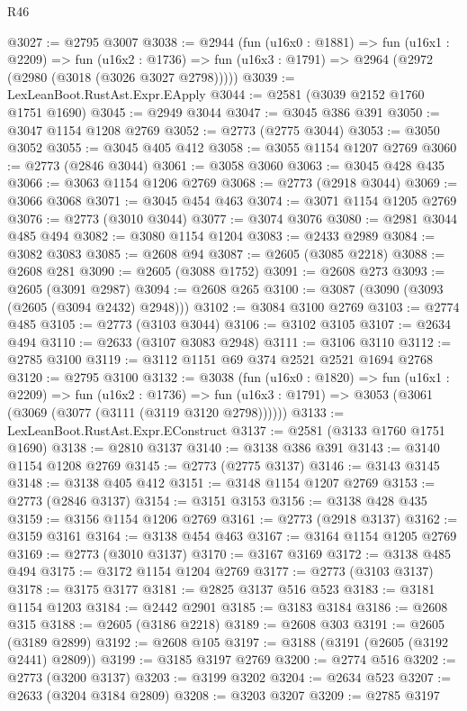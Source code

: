 \begin{lexlean}{R46}
\begin{coremodule}
@3027 := @2795 @3007
@3038 := @2944
    (fun (u16x0 : @1881) =>
    fun (u16x1 : @2209) =>
    fun (u16x2 : @1736) => fun (u16x3 : @1791) => @2964 (@2972 (@2980 (@3018 (@3026 @3027 @2798)))))
@3039 := LexLeanBoot.RustAst.Expr.EApply
@3044 := @2581 (@3039 @2152 @1760 @1751 @1690)
@3045 := @2949 @3044
@3047 := @3045 @386 @391
@3050 := @3047 @1154 @1208 @2769
@3052 := @2773 (@2775 @3044)
@3053 := @3050 @3052
@3055 := @3045 @405 @412
@3058 := @3055 @1154 @1207 @2769
@3060 := @2773 (@2846 @3044)
@3061 := @3058 @3060
@3063 := @3045 @428 @435
@3066 := @3063 @1154 @1206 @2769
@3068 := @2773 (@2918 @3044)
@3069 := @3066 @3068
@3071 := @3045 @454 @463
@3074 := @3071 @1154 @1205 @2769
@3076 := @2773 (@3010 @3044)
@3077 := @3074 @3076
@3080 := @2981 @3044 @485 @494
@3082 := @3080 @1154 @1204
@3083 := @2433 @2989
@3084 := @3082 @3083
@3085 := @2608 @94
@3087 := @2605 (@3085 @2218)
@3088 := @2608 @281
@3090 := @2605 (@3088 @1752)
@3091 := @2608 @273
@3093 := @2605 (@3091 @2987)
@3094 := @2608 @265
@3100 := @3087 (@3090 (@3093 (@2605 (@3094 @2432) @2948)))
@3102 := @3084 @3100 @2769
@3103 := @2774 @485
@3105 := @2773 (@3103 @3044)
@3106 := @3102 @3105
@3107 := @2634 @494
@3110 := @2633 (@3107 @3083 @2948)
@3111 := @3106 @3110
@3112 := @2785 @3100
@3119 := @3112 @1151 @69 @374 @2521 @2521 @1694 @2768
@3120 := @2795 @3100
@3132 := @3038
    (fun (u16x0 : @1820) =>
    fun (u16x1 : @2209) =>
    fun (u16x2 : @1736) =>
    fun (u16x3 : @1791) => @3053 (@3061 (@3069 (@3077 (@3111 (@3119 @3120 @2798))))))
@3133 := LexLeanBoot.RustAst.Expr.EConstruct
@3137 := @2581 (@3133 @1760 @1751 @1690)
@3138 := @2810 @3137
@3140 := @3138 @386 @391
@3143 := @3140 @1154 @1208 @2769
@3145 := @2773 (@2775 @3137)
@3146 := @3143 @3145
@3148 := @3138 @405 @412
@3151 := @3148 @1154 @1207 @2769
@3153 := @2773 (@2846 @3137)
@3154 := @3151 @3153
@3156 := @3138 @428 @435
@3159 := @3156 @1154 @1206 @2769
@3161 := @2773 (@2918 @3137)
@3162 := @3159 @3161
@3164 := @3138 @454 @463
@3167 := @3164 @1154 @1205 @2769
@3169 := @2773 (@3010 @3137)
@3170 := @3167 @3169
@3172 := @3138 @485 @494
@3175 := @3172 @1154 @1204 @2769
@3177 := @2773 (@3103 @3137)
@3178 := @3175 @3177
@3181 := @2825 @3137 @516 @523
@3183 := @3181 @1154 @1203
@3184 := @2442 @2901
@3185 := @3183 @3184
@3186 := @2608 @315
@3188 := @2605 (@3186 @2218)
@3189 := @2608 @303
@3191 := @2605 (@3189 @2899)
@3192 := @2608 @105
@3197 := @3188 (@3191 (@2605 (@3192 @2441) @2809))
@3199 := @3185 @3197 @2769
@3200 := @2774 @516
@3202 := @2773 (@3200 @3137)
@3203 := @3199 @3202
@3204 := @2634 @523
@3207 := @2633 (@3204 @3184 @2809)
@3208 := @3203 @3207
@3209 := @2785 @3197

\end{coremodule}
\end{lexlean}
